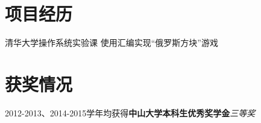   \resumeSubHeadingListEnd

\section{项目经历}
  \resumeSubHeadingListStart
      {清华大学操作系统实验课}
      {使用汇编实现“俄罗斯方块”游戏}
  \resumeSubHeadingListEnd

\section{获奖情况}
  \resumeSubHeadingListStart
  \small
    \item{2012-2013、2014-2015学年均获得\textbf{中山大学本科生优秀奖学金}\textit{三等奖}}
  \resumeSubHeadingListEnd

